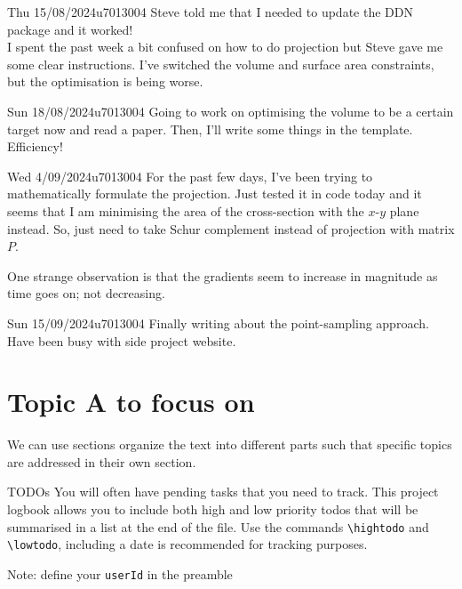 \documentclass{project-logbook}
\begin{document}
	\begin{MeetingMinutes}{Thu 15/08/2024}{u7013004}
		Steve told me that I needed to update the DDN package and it worked!\\
		I spent the past week a bit confused on how to do projection but Steve gave me some clear instructions. I've switched the volume and surface area constraints, but the optimisation is being worse.
	\end{MeetingMinutes}

	\begin{MeetingMinutes}{Sun 18/08/2024}{u7013004}
		Going to work on optimising the volume to be a certain target now and read a paper. Then, I'll write some things in the template. Efficiency!
	\end{MeetingMinutes}

	\begin{MeetingMinutes}{Wed 4/09/2024}{u7013004}
		For the past few days, I've been trying to mathematically formulate the projection. Just tested it in code today and it seems that I am minimising the area of the cross-section with the $x$-$y$ plane instead. So, just need to take Schur complement instead of projection with matrix $P$.

		One strange observation is that the gradients seem to increase in magnitude as time goes on; not decreasing.
	\end{MeetingMinutes}
	
	\begin{MeetingMinutes}{Sun 15/09/2024}{u7013004}
		Finally writing about the point-sampling approach. Have been busy with side project website.
	\end{MeetingMinutes}

\section{Topic A to focus on} \label{sec:topic_A}
	We can use sections organize the text into different parts  such that specific topics are addressed in their own section.

		\begin{HighlightedNote}{TODOs}
			You will often have pending tasks that you need to track. This project logbook allows you to include both high and low priority todos that will be summarised in a list at the end of the file. Use the commands \texttt{\textbackslash hightodo} and \texttt{\textbackslash lowtodo}, including a date is recommended for tracking purposes.

			Note: define your \texttt{userId} in the preamble
		\end{HighlightedNote}
\end{document}
